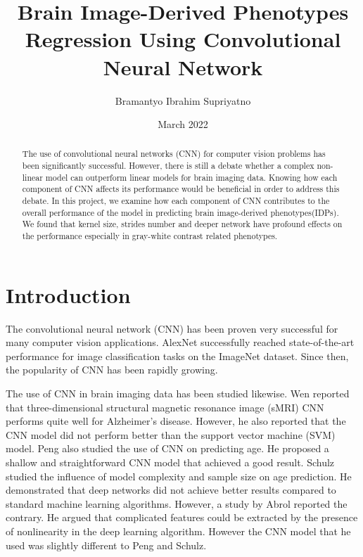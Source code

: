 \documentclass{article}
\title{Brain Image-Derived Phenotypes Regression Using Convolutional Neural Network}
\author{Bramantyo Ibrahim Supriyatno}
\date{March 2022}
\begin{document}
    \maketitle
    \begin{abstract}
        The use of convolutional neural networks (CNN) for computer vision problems has been significantly successful. 
        However, there is still a debate whether a complex non-linear model can outperform linear models for brain imaging data. 
        Knowing how each component of CNN affects its performance would be beneficial in order to address this debate. 
        In this project, we examine how each component of CNN contributes to the overall performance of the model in predicting brain image-derived phenotypes(IDPs). 
        We found that kernel size, strides number and deeper network have profound effects on the performance especially in gray-white contrast related phenotypes. 
    \end{abstract}
    
    \section*{Introduction}
    The convolutional neural network (CNN) has been proven very successful for many computer vision applications. 
    AlexNet\cite{alexnet} successfully reached state-of-the-art performance for image classification tasks on the ImageNet dataset. 
    Since then, the popularity of CNN has been rapidly growing.
    
    The use of CNN in brain imaging data has been studied likewise. 
    Wen\cite{wen} reported that three-dimensional structural magnetic resonance image (sMRI) CNN performs quite well for Alzheimer's disease. 
    However, he also reported that the CNN model did not perform better than the support vector machine (SVM) model. 
    Peng\cite{peng} also studied the use of CNN on predicting age. He proposed a shallow and straightforward CNN model that achieved a good result. 
    Schulz\cite{schulz} studied the influence of model complexity and sample size on age prediction. 
    He demonstrated that deep networks did not achieve better results compared to standard machine learning algorithms. 
    However, a study by Abrol\cite{abrol} reported the contrary. 
    He argued that complicated features could be extracted by the presence of nonlinearity in the deep learning algorithm. 
    However the CNN model that he used was slightly different to Peng and Schulz. 
        
\end{document}

